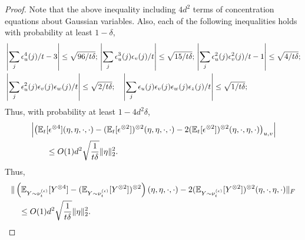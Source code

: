 \begin{proof}
	Note that the above inequality including $4d^2$ terms of concentration equations about Gaussian variables. 
	Also, each of the following inequalities holds with probability at least $1-\delta$,
	\begin{align*}
	& \left| \sum_j\epsilon_u^4(j)/t -3 \right| \le \sqrt{96/t\delta}; \, \left| \sum_j\epsilon_u^3(j)\epsilon_v(j)/t \right| \le \sqrt{15/t\delta}; \, \left| \sum_j\epsilon_u^2(j)\epsilon_v^2(j)/t - 1\right| \le \sqrt{4/t\delta};\\ 
	& \left| \sum_j\epsilon_u^2(j)\epsilon_v(j)\epsilon_w(j)/t \right| \le \sqrt{2/t\delta}; \quad  \left| \sum_j\epsilon_u(j)\epsilon_v(j)\epsilon_w(j)\epsilon_z(j)/t \right| \le \sqrt{1/t\delta};
	\end{align*}
	Thus, with probability at least $1-4d^2\delta$,
	\begin{align*}
	& \left|\left(\mathbb{E}_t[\epsilon^{\otimes4}](\eta,\eta,\cdot,\cdot) - (\mathbb{E}_t[\epsilon^{\otimes2}])^{\otimes 2}(\eta,\eta,\cdot,\cdot) - 2(\mathbb{E}_t[\epsilon^{\otimes2}])^{\otimes 2}(\eta,\cdot,\eta,\cdot) \right)_{u,v}\right| \\
	& \qquad \le
	O(1)d^2\sqrt{\frac{1}{t\delta}}\|\eta\|_2^2.
	\end{align*}
	Thus, 
	\begin{align}
	& \| \left(\mathbb{E}_{Y\sim \nu_t^{(\epsilon)}} [Y^{\otimes4}] - (\mathbb{E}_{Y\sim \nu_t^{(\epsilon)}} [Y^{\otimes2}])^{\otimes 2}\right)(\eta,\eta,\cdot,\cdot) - 2 (\mathbb{E}_{Y\sim \nu_t^{(\epsilon)}} [Y^{\otimes2}])^{\otimes 2}(\eta,\cdot,\eta,\cdot)\|_F \nonumber\\
	& \quad \le 
	O(1)d^2\sqrt{\frac{1}{t\delta}}\|\eta\|_2^2.\label{eq:A1claim3}
	\end{align}
	

\end{proof}
